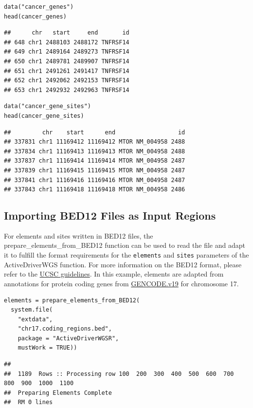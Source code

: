 \documentclass[]{article}
\begin{document}
\begin{verbatim}
data("cancer_genes")
head(cancer_genes)
\end{verbatim}

\begin{verbatim}
##      chr   start     end       id
## 648 chr1 2488103 2488172 TNFRSF14
## 649 chr1 2489164 2489273 TNFRSF14
## 650 chr1 2489781 2489907 TNFRSF14
## 651 chr1 2491261 2491417 TNFRSF14
## 652 chr1 2492062 2492153 TNFRSF14
## 653 chr1 2492932 2492963 TNFRSF14
\end{verbatim}

\begin{verbatim}
data("cancer_gene_sites")
head(cancer_gene_sites)
\end{verbatim}

\begin{verbatim}
##         chr    start      end                  id
## 337831 chr1 11169412 11169412 MTOR NM_004958 2488
## 337834 chr1 11169413 11169413 MTOR NM_004958 2488
## 337837 chr1 11169414 11169414 MTOR NM_004958 2487
## 337839 chr1 11169415 11169415 MTOR NM_004958 2487
## 337841 chr1 11169416 11169416 MTOR NM_004958 2487
## 337843 chr1 11169418 11169418 MTOR NM_004958 2486
\end{verbatim}

\subsection{Importing BED12 Files as Input
Regions}\label{importing-bed12-files-as-input-regions}

For elements and sites written in BED12 files, the
prepare\_elements\_from\_BED12 function can be used to read the file and
adapt it to fulfill the format requirements for the \texttt{elements}
and \texttt{sites} parameters of the ActiveDriverWGS function. For more
information on the BED12 format, please refer to the
\href{https://genome.ucsc.edu/FAQ/FAQformat.html\#format1}{UCSC
guidelines}. In this example, elements are adapted from annotations for
protein coding genes from
\href{https://www.gencodegenes.org/human/release_19.html}{GENCODE.v19}
for chromosome 17.

\begin{verbatim}
elements = prepare_elements_from_BED12(
  system.file(
    "extdata", 
    "chr17.coding_regions.bed", 
    package = "ActiveDriverWGSR", 
    mustWork = TRUE))
\end{verbatim}

\begin{verbatim}
## 
##  1189  Rows :: Processing row 100  200  300  400  500  600  700  800  900  1000  1100  
##  Preparing Elements Complete 
##  RM 0 lines
\end{verbatim}
\end{document}
